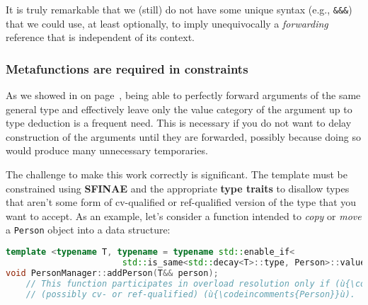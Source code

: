 \noindent It is truly remarkable that we (still) do not have some unique syntax
(e.g., \texttt{\&\&\&}) that we could use, at least optionally, to imply
unequivocally a \emph{forwarding} reference that is independent of its
context.

\subsubsection[Metafunctions are required in constraints]{Metafunctions are required in constraints}\label{metafunctions-are-required-in-constraints}

As we showed in \textit{} on page~\pageref{use-cases-forwardingref}, being able to
perfectly forward arguments of the same general type and effectively
leave only the value category of the argument up to type deduction is a frequent need. This
is necessary if you do not want to delay construction of the arguments
until they are forwarded, possibly because doing so would produce many
unnecessary temporaries.

The challenge to make this work correctly is significant. The template
must be constrained using \textbf{SFINAE} and the appropriate
\textbf{type traits} to disallow types that aren't some form of
cv-qualified or ref-qualified version of the type that you want to
accept. As an example, let's consider a function intended to \emph{copy}
or \emph{move} a \texttt{Person} object into a data structure:

\begin{lstlisting}[language=C++]
template <typename T, typename = typename std::enable_if<
                       std::is_same<std::decay<T>::type, Person>::value>::type>
void PersonManager::addPerson(T&& person);
    // This function participates in overload resolution only if (ù{\codeincomments{T}}ù) is
    // (possibly cv- or ref-qualified) (ù{\codeincomments{Person}}ù).
\end{lstlisting}
    
